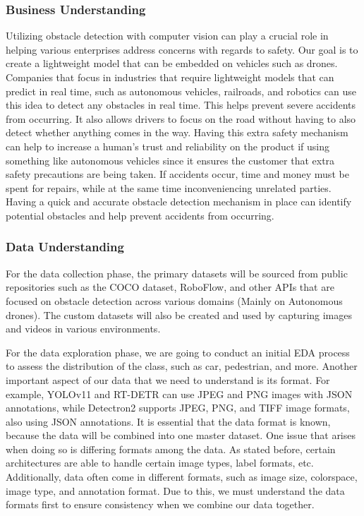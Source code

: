 \documentclass[stu,12pt,floatsintext]{apa7}
\begin{document}
\subsubsection{Business Understanding}
Utilizing obstacle detection with computer vision can play a crucial role in helping various enterprises address concerns with regards to safety. Our goal is to create a lightweight model that can be embedded on vehicles such as drones. Companies that focus in industries that require lightweight models that can predict in real time, such as autonomous vehicles, railroads, and robotics can use this idea to detect any obstacles in real time. This helps prevent severe accidents from occurring. It also allows drivers to focus on the road without having to also detect whether anything comes in the way. Having this extra safety mechanism can help to increase a human's trust and reliability on the product if using something like autonomous vehicles since it ensures the customer that extra safety precautions are being taken. If accidents occur, time and money must be spent for repairs, while at the same time inconveniencing unrelated parties. Having a quick and accurate obstacle detection mechanism in place can identify potential obstacles and help prevent accidents from occurring.


\subsubsection{Data Understanding}
For the data collection phase, the primary datasets will be sourced from public repositories such as the COCO dataset, RoboFlow, and other APIs that are focused on obstacle detection across various domains (Mainly on Autonomous drones). The custom datasets will also be created and used by capturing images and videos in various environments.

For the data exploration phase, we are going to conduct an initial EDA process to assess the distribution of the class, such as car, pedestrian, and more. Another important aspect of our data that we need to understand is its format. For example, YOLOv11 and RT-DETR can use JPEG and PNG images with JSON annotations, while Detectron2 supports JPEG, PNG, and TIFF image formats, also using JSON annotations. It is essential that the data format is known, because the data will be combined into one master dataset. One issue that arises when doing so is differing formats among the data. As stated before, certain architectures are able to handle certain image types, label formats, etc. Additionally, data often come in different formats, such as image size, colorspace, image type, and annotation format. Due to this, we must understand the data formats first to ensure consistency when we combine our data together.
\end{document}

